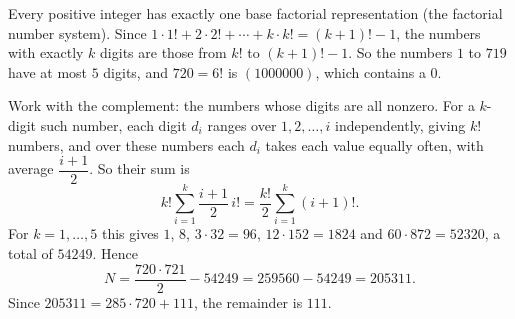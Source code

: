 Every positive integer has exactly one base factorial representation (the factorial number system). Since $1\cdot1!+2\cdot2!+\cdots+k\cdot k!=(k+1)!-1$, the numbers with exactly $k$ digits are those from $k!$ to $(k+1)!-1$. So the numbers $1$ to $719$ have at most $5$ digits, and $720=6!$ is $(1000000)$, which contains a $0$.

Work with the complement: the numbers whose digits are all nonzero. For a $k$-digit such number, each digit $d_i$ ranges over $1,2,\dots,i$ independently, giving $k!$ numbers, and over these numbers each $d_i$ takes each value equally often, with average $\dfrac{i+1}{2}$. So their sum is
\[
k!\sum_{i=1}^{k}\dfrac{i+1}{2}\,i!=\dfrac{k!}{2}\sum_{i=1}^{k}(i+1)! .
\]
For $k=1,\dots,5$ this gives $1$, $8$, $3\cdot32=96$, $12\cdot152=1824$ and $60\cdot872=52320$, a total of $54249$. Hence
\[
N=\dfrac{720\cdot721}{2}-54249=259560-54249=205311 .
\]
Since $205311=285\cdot720+111$, the remainder is $\boxed{111}$.
